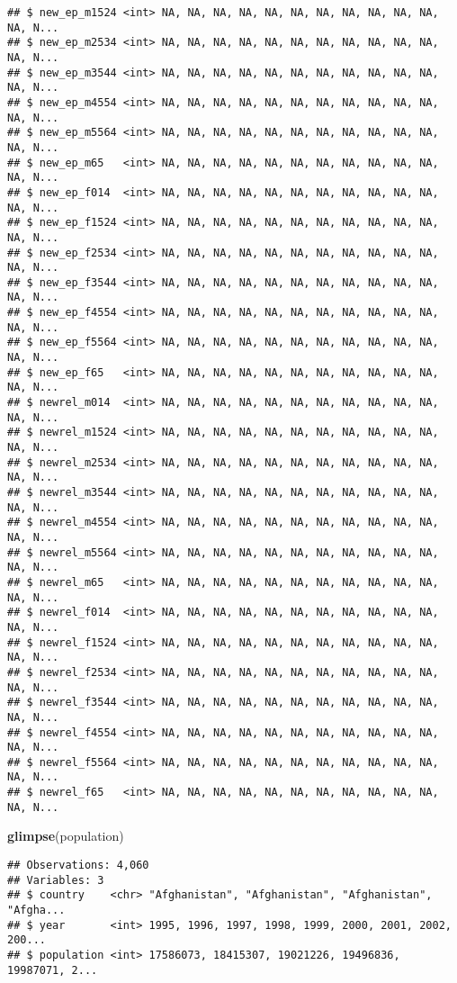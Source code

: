 \documentclass[]{article}
\newenvironment{Shaded}{\begin{snugshade}}{\end{snugshade}}
\newcommand{\KeywordTok}[1]{\textcolor[rgb]{0.13,0.29,0.53}{\textbf{#1}}}
\newcommand{\NormalTok}[1]{#1}
\begin{document}
\begin{verbatim}
## $ new_ep_m1524 <int> NA, NA, NA, NA, NA, NA, NA, NA, NA, NA, NA, NA, N...
## $ new_ep_m2534 <int> NA, NA, NA, NA, NA, NA, NA, NA, NA, NA, NA, NA, N...
## $ new_ep_m3544 <int> NA, NA, NA, NA, NA, NA, NA, NA, NA, NA, NA, NA, N...
## $ new_ep_m4554 <int> NA, NA, NA, NA, NA, NA, NA, NA, NA, NA, NA, NA, N...
## $ new_ep_m5564 <int> NA, NA, NA, NA, NA, NA, NA, NA, NA, NA, NA, NA, N...
## $ new_ep_m65   <int> NA, NA, NA, NA, NA, NA, NA, NA, NA, NA, NA, NA, N...
## $ new_ep_f014  <int> NA, NA, NA, NA, NA, NA, NA, NA, NA, NA, NA, NA, N...
## $ new_ep_f1524 <int> NA, NA, NA, NA, NA, NA, NA, NA, NA, NA, NA, NA, N...
## $ new_ep_f2534 <int> NA, NA, NA, NA, NA, NA, NA, NA, NA, NA, NA, NA, N...
## $ new_ep_f3544 <int> NA, NA, NA, NA, NA, NA, NA, NA, NA, NA, NA, NA, N...
## $ new_ep_f4554 <int> NA, NA, NA, NA, NA, NA, NA, NA, NA, NA, NA, NA, N...
## $ new_ep_f5564 <int> NA, NA, NA, NA, NA, NA, NA, NA, NA, NA, NA, NA, N...
## $ new_ep_f65   <int> NA, NA, NA, NA, NA, NA, NA, NA, NA, NA, NA, NA, N...
## $ newrel_m014  <int> NA, NA, NA, NA, NA, NA, NA, NA, NA, NA, NA, NA, N...
## $ newrel_m1524 <int> NA, NA, NA, NA, NA, NA, NA, NA, NA, NA, NA, NA, N...
## $ newrel_m2534 <int> NA, NA, NA, NA, NA, NA, NA, NA, NA, NA, NA, NA, N...
## $ newrel_m3544 <int> NA, NA, NA, NA, NA, NA, NA, NA, NA, NA, NA, NA, N...
## $ newrel_m4554 <int> NA, NA, NA, NA, NA, NA, NA, NA, NA, NA, NA, NA, N...
## $ newrel_m5564 <int> NA, NA, NA, NA, NA, NA, NA, NA, NA, NA, NA, NA, N...
## $ newrel_m65   <int> NA, NA, NA, NA, NA, NA, NA, NA, NA, NA, NA, NA, N...
## $ newrel_f014  <int> NA, NA, NA, NA, NA, NA, NA, NA, NA, NA, NA, NA, N...
## $ newrel_f1524 <int> NA, NA, NA, NA, NA, NA, NA, NA, NA, NA, NA, NA, N...
## $ newrel_f2534 <int> NA, NA, NA, NA, NA, NA, NA, NA, NA, NA, NA, NA, N...
## $ newrel_f3544 <int> NA, NA, NA, NA, NA, NA, NA, NA, NA, NA, NA, NA, N...
## $ newrel_f4554 <int> NA, NA, NA, NA, NA, NA, NA, NA, NA, NA, NA, NA, N...
## $ newrel_f5564 <int> NA, NA, NA, NA, NA, NA, NA, NA, NA, NA, NA, NA, N...
## $ newrel_f65   <int> NA, NA, NA, NA, NA, NA, NA, NA, NA, NA, NA, NA, N...
\end{verbatim}

\begin{Shaded}
\begin{Highlighting}[]
\KeywordTok{glimpse}\NormalTok{(population)}
\end{Highlighting}
\end{Shaded}

\begin{verbatim}
## Observations: 4,060
## Variables: 3
## $ country    <chr> "Afghanistan", "Afghanistan", "Afghanistan", "Afgha...
## $ year       <int> 1995, 1996, 1997, 1998, 1999, 2000, 2001, 2002, 200...
## $ population <int> 17586073, 18415307, 19021226, 19496836, 19987071, 2...
\end{verbatim}
\end{document}
